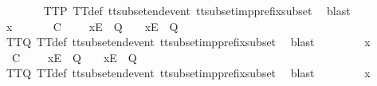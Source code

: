\begin{isabellebody}
\ \ \ \ \ \ \isamarkupfalse%
\ TT{}{\isacharunderscore}P\ TT{}{\isacharunderscore}def\ tt{\isacharunderscore}subset{\isacharunderscore}end{\isacharunderscore}event\ tt{\isacharunderscore}subset{\isacharunderscore}imp{\isacharunderscore}prefix{\isacharunderscore}subset\ \isamarkupfalse%
\ blast\isanewline
\ \ \isamarkupfalse%
\isanewline
\ \ \ \ \isamarkupfalse%
\ x\isanewline
\ \ \ \ \isamarkupfalse%
\ {\isachardoublequoteopen}{\isasymrho}{\isacharprime}\ {\isasymsubseteq}\isactrlsub C\ {\isasymrho}{\isacharprime}{\isacharprime}\ {\isasymLongrightarrow}\ {\isasymrho}{\isacharprime}{\isacharprime}\ {\isacharat}\ {\isacharbrackleft}{\isacharbrackleft}x{\isacharbrackright}\isactrlsub E{\isacharbrackright}\ {\isasymin}\ Q\ {\isasymLongrightarrow}\ {\isasymrho}{\isacharprime}\ {\isacharat}\ {\isacharbrackleft}{\isacharbrackleft}x{\isacharbrackright}\isactrlsub E{\isacharbrackright}\ {\isasymin}\ Q{\isachardoublequoteclose}\isanewline
\ \ \ \ \ \ \isamarkupfalse%
\ TT{}{\isacharunderscore}Q\ TT{}{\isacharunderscore}def\ tt{\isacharunderscore}subset{\isacharunderscore}end{\isacharunderscore}event\ tt{\isacharunderscore}subset{\isacharunderscore}imp{\isacharunderscore}prefix{\isacharunderscore}subset\ \isamarkupfalse%
\ blast\isanewline
\ \ \isamarkupfalse%
\isanewline
\ \ \ \ \isamarkupfalse%
\ x\isanewline
\ \ \ \ \isamarkupfalse%
\ {\isachardoublequoteopen}{\isasymrho}{\isacharprime}\ {\isasymsubseteq}\isactrlsub C\ {\isasymrho}{\isacharprime}{\isacharprime}\ {\isasymLongrightarrow}\ {\isasymrho}{\isacharprime}{\isacharprime}\ {\isacharat}\ {\isacharbrackleft}{\isacharbrackleft}x{\isacharbrackright}\isactrlsub E{\isacharbrackright}\ {\isasymin}\ Q\ {\isasymLongrightarrow}\ {\isasymrho}{\isacharprime}\ {\isacharat}\ {\isacharbrackleft}{\isacharbrackleft}x{\isacharbrackright}\isactrlsub E{\isacharbrackright}\ {\isasymin}\ Q{\isachardoublequoteclose}\isanewline
\ \ \ \ \ \ \isamarkupfalse%
\ TT{}{\isacharunderscore}Q\ TT{}{\isacharunderscore}def\ tt{\isacharunderscore}subset{\isacharunderscore}end{\isacharunderscore}event\ tt{\isacharunderscore}subset{\isacharunderscore}imp{\isacharunderscore}prefix{\isacharunderscore}subset\ \isamarkupfalse%
\ blast\isanewline
\ \ \isamarkupfalse%
\isanewline
\ \ \ \ \isamarkupfalse%
\ x\isanewline
\ \ \ \ \isamarkupfalse%

\end{isabellebody}
